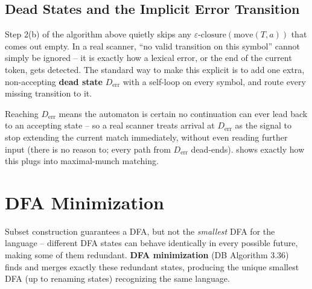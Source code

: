 \documentclass[full-course-notes.tex]{subfiles}
\begin{document}
\subsection{Dead States and the Implicit Error Transition}
\label{sec:l6-dead-states}

\dbtag Step 2(b) of the algorithm above quietly skips any $\varepsilon\text{-closure}(\text{move}(T,a))$
that comes out empty. In a real scanner, ``no valid transition on this symbol'' cannot simply be
ignored -- it is exactly how a lexical error, or the end of the current token, gets detected. The
standard way to make this explicit is to add one extra, non-accepting \textbf{dead state} $D_{\text{err}}$
with a self-loop on every symbol, and route every missing transition to it.

\begin{center}
\end{center}

Reaching $D_{\text{err}}$ means the automaton is certain no continuation can ever lead back to
an accepting state -- so a real scanner treats arrival at $D_{\text{err}}$ as the signal to stop
extending the current match immediately, without even reading further input (there is no reason
to; every path from $D_{\text{err}}$ dead-ends).  shows exactly
how this plugs into maximal-munch matching.

\section{DFA Minimization}
\label{sec:l6-minimization}

\dbtag Subset construction guarantees a DFA, but not the \emph{smallest} DFA for the language --
different DFA states can behave identically in every possible future, making some of them
redundant. \textbf{DFA minimization} (DB Algorithm 3.36) finds and merges exactly these
redundant states, producing the unique smallest DFA (up to renaming states) recognizing the same
language.
\end{document}
